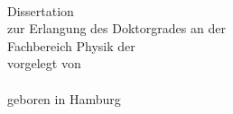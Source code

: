 
\begin{titlepage}
    \begin{addmargin}[-0cm]{-0.5cm}
	    \begin{center}


	        \begingroup
	        	\LARGE
	        	\color{RWTHblau}
	        	{\scshape \myTitle}\\
	        \endgroup

	        \vspace{2.5cm}
	        \Large
	        {Dissertation}\\
	        \vspace{0.5cm}
	        {zur Erlangung des Doktorgrades an der \myFaculty}\\
			\vspace{0.5cm}
	        {Fachbereich Physik der \myUniGenitiv}\\
	        \vspace{0.5cm}
	        {vorgelegt von}\\
	        \vspace{1.5cm}
	        \Large
	        {\scshape \myName} \\
					\vspace{1.5cm}
					\Large
					{geboren in Hamburg} \\
	        \Large

	        \vfill
	        {\myLocation}\\
	        {\myTime}\\

	        \vfill


    	\end{center}
	\end{addmargin}
\end{titlepage}
